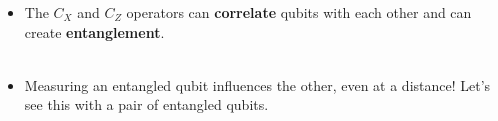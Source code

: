 \documentclass[aspectratio=169,12pt]{beamer}
\begin{document}
\begin{frame}
  \begin{itemize}[<+->]
    \item The $C_X^{}$ and $C_Z^{}$ operators can \textbf{correlate} qubits with each other and can create \textbf{entanglement}.\\~\\
    \item Measuring an entangled qubit influences the other, even at a distance! Let's see this with a pair of entangled qubits.
     \\~\\
  \end{itemize}
\end{frame}


\end{document}
